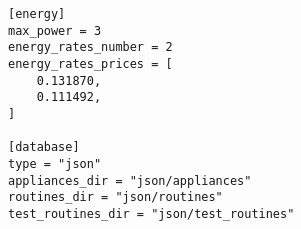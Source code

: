 \begin{lstlisting}[language=numbered,caption={[Example of the configuration file used during development]Example of the configuration file used during development.},label=code:config,float,floatplacement=H]
[energy]
max_power = 3
energy_rates_number = 2
energy_rates_prices = [
    0.131870,
    0.111492,
]

[database]
type = "json"
appliances_dir = "json/appliances"
routines_dir = "json/routines"
test_routines_dir = "json/test_routines"
\end{lstlisting}